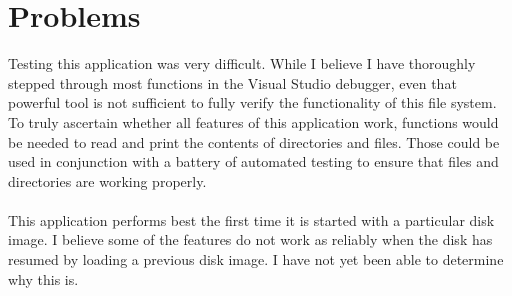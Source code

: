 \documentclass[]{article}
\begin{document}
\section{Problems} \label{sec:problems}
Testing this application was very difficult. While I believe I have thoroughly stepped through most functions in the Visual Studio debugger, even that powerful tool is not sufficient to fully verify the functionality of this file system. To truly ascertain whether all features of this application work, functions would be needed to read and print the contents of directories and files. Those could be used in conjunction with a battery of automated testing to ensure that files and directories are working properly.
\\ \\
This application performs best the first time it is started with a particular disk image. I believe some of the features do not work as reliably when the disk has resumed by loading a previous disk image. I have not yet been able to determine why this is.
\end{document}
